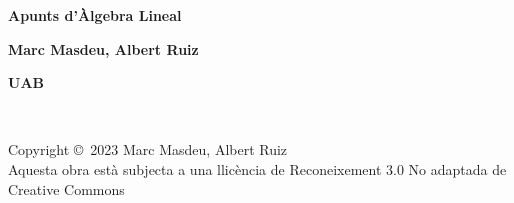 	{ %

		\centering\sffamily %
		\par
		\vspace{10pt}
		\par
		{\Huge\bfseries Apunts d'Àlgebra Lineal\par} %
		\vspace{16pt} %
		{\LARGE\bfseries Marc Masdeu, Albert Ruiz\par} %
		\vspace{20pt} %
		{\LARGE\bfseries UAB\par}
	}



\newpage
~\vfill
\thispagestyle{empty}

\noindent Copyright \copyright\ 2023 Marc Masdeu, Albert Ruiz\\ %



\noindent Aquesta obra està subjecta a una llicència de Reconeixement 3.0 No adaptada de Creative Commons



\usechapterimagefalse %

\pagestyle{empty} %


\tableofcontents %

\cleardoublepage %

\pagestyle{fancy} %
